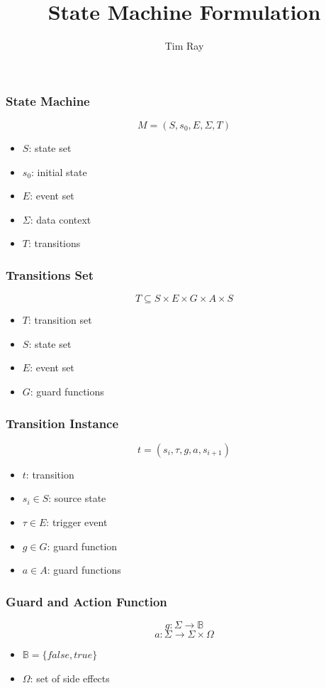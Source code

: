 \documentclass{beamer}
\title{State Machine Formulation}
\author{Tim Ray}
\begin{document}
\begin{frame}[plain]
    \maketitle
\end{frame}
\begin{frame}
    \frametitle{State Machine}
    \[ M = (S, s_0, E, \Sigma, T) \]
    \begin{itemize}
    		\item { $S$: state set}
    		\item { $s_0$: initial state }
    		\item { $E$: event set }
    		\item { $\Sigma$: data context}
    		\item { $T$: transitions}
    \end{itemize}
\end{frame}

\begin{frame}
    \frametitle{Transitions Set}
    \[ T \subseteq S \times E \times G \times A \times S \]
    \begin{itemize}
        	\item { $T$: transition set}
    		\item { $S$: state set}
    		\item { $E$: event set }
    		\item { $G$: guard functions }
    \end{itemize}
\end{frame}

\begin{frame}
    \frametitle{Transition Instance}
    \[ t = (s_i, \tau, g, a, s_{i+1}) \]
    \begin{itemize}
        	\item { $t$: transition}
    		\item { $s_i \in S$: source state }
    		\item { $\tau \in E$: trigger event }
    		\item { $g \in G$: guard function }
    		\item { $a \in A$: guard functions }
    \end{itemize}
\end{frame}

\begin{frame}
    \frametitle{Guard and Action Function}
    \[ g: \Sigma \rightarrow \mathbb{B}\]
    \[ a: \Sigma \rightarrow \Sigma \times \Omega \]
        \begin{itemize}
        	\item { $\mathbb{B} = \{ false, true \}$  }
    		\item { $\Omega$: set of side effects }
    \end{itemize}
\end{frame}
\end{document}

